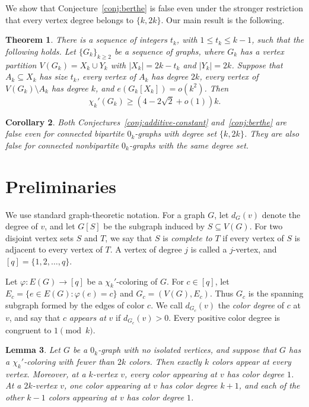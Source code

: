 \documentclass[11pt]{article}
\newtheorem{theorem}{Theorem}[section]
\newtheorem{lemma}[theorem]{Lemma}
\newtheorem{corollary}[theorem]{Corollary}
\newcommand{\chik}{\chi_k'}
\begin{document}
We show that Conjecture~\ref{conj:berthe} is false even under the
stronger restriction that every vertex degree belongs to $\{k,2k\}$.
Our main result is the following.

\begin{theorem}\label{thm1}
There is a sequence of integers $t_k$, with $1\leq t_k\leq k-1$,
such that the following holds. Let $\{G_k\}_{k\geq2}$ be a sequence
of graphs, where $G_k$ has a vertex partition
$V(G_k)=X_k\cup Y_k$ with $|X_k|=2k-t_k$ and $|Y_k|=2k$.
Suppose that $A_k\subseteq X_k$ has size $t_k$, every vertex of
$A_k$ has degree $2k$, every vertex of $V(G_k)\setminus A_k$ has
degree $k$, and $e(G_k[X_k])=o(k^2)$. Then
\[
\chik(G_k)\geq\left(4-2\sqrt2+o(1)\right)k.
\]
\end{theorem}

\begin{corollary}\label{cor:counterexamples}
Both Conjectures~\ref{conj:additive-constant} and~\ref{conj:berthe} are
false even for connected bipartite $0_k$-graphs with degree set
$\{k,2k\}$. They are also false for connected nonbipartite $0_k$-graphs
with the same degree set.
\end{corollary}

\section{Preliminaries}\label{sec:notation}

We use standard graph-theoretic notation. For a graph $G$, let $d_G(v)$
denote the degree of $v$, and let $G[S]$ be the subgraph induced by
$S\subseteq V(G)$. For two disjoint vertex sets $S$ and $T$, we say
that $S$ is \emph{complete to} $T$ if every vertex of $S$ is adjacent
to every vertex of $T$. A vertex of degree $j$ is called a $j$-vertex,
and $[q]=\{1,2,\ldots,q\}$.

Let $\varphi:E(G)\to[q]$ be a $\chi_k'$-coloring of $G$. For
$c\in[q]$, let $E_c=\{e\in E(G):\varphi(e)=c\}$ and
$G_c=(V(G),E_c)$. Thus $G_c$ is the spanning subgraph formed by the
edges of color $c$. We call $d_{G_c}(v)$ the \emph{color degree} of
$c$ at $v$, and say that $c$ \emph{appears at} $v$ if
$d_{G_c}(v)>0$. Every positive color degree is congruent to
$1\pmod{k}$.

\begin{lemma}\label{lem:k-colors-at-vertex}
Let $G$ be a $0_k$-graph with no isolated vertices, and suppose that
$G$ has a $\chi_k'$-coloring with fewer than $2k$ colors. Then exactly
$k$ colors appear at every vertex. Moreover, at a $k$-vertex $v$, every
color appearing at $v$ has color degree $1$. At a $2k$-vertex $v$, one
color appearing at $v$ has color degree $k+1$, and each of the other
$k-1$ colors appearing at $v$ has color degree $1$.
\end{lemma}
\end{document}
